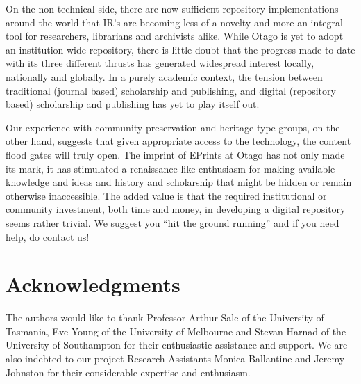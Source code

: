 \documentclass[12pt,pdftex,a4paper,titlepage]{article}
\begin{document}
On the non-technical side, there are now sufficient repository implementations around the world that IR's are becoming less of a novelty and more an integral tool for researchers, librarians and archivists alike. While Otago is yet to adopt an institution-wide repository, there is little doubt that the progress made to date with its three different thrusts has generated widespread interest locally, nationally and globally. In a purely academic context, the tension between traditional (journal based) scholarship and publishing, and digital (repository based) scholarship and publishing has yet to play itself out.

Our experience with community preservation and heritage type groups, on the other hand, suggests that given appropriate access to the technology, the content flood gates will truly open. The imprint of EPrints at Otago has not only made its mark, it has stimulated a renaissance-like enthusiasm for making available knowledge and ideas and history and scholarship that might be hidden or remain otherwise inaccessible. The added value is that the required institutional or community investment, both time and money, in developing a digital repository seems rather trivial.  We suggest you ``hit the ground running'' and if you need help, do contact us!


\section*{Acknowledgments}

The authors would like to thank Professor Arthur Sale of the University of Tasmania, Eve Young of the University of Melbourne and Stevan Harnad of the University of Southampton for their enthusiastic assistance and support. We are also indebted to our project Research Assistants Monica Ballantine and Jeremy Johnston for their considerable expertise and enthusiasm.



\end{document}
